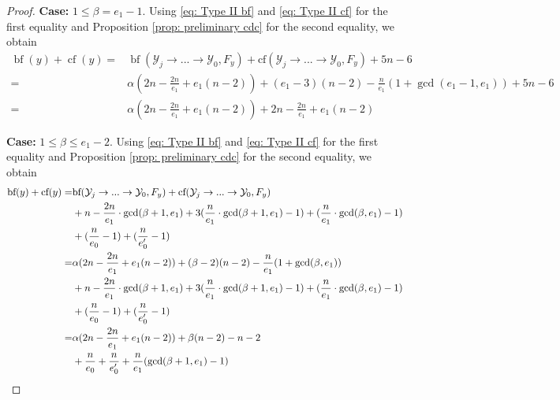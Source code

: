\documentclass[12pt]{amsart}
\numberwithin{equation}{section}
\theoremstyle{definition}
\newcommand{\Y}{\mathcal{Y}}
\newcommand{\tx}[1]{\text{#1}}
\DeclareMathOperator{\blf}{bf}
\DeclareMathOperator{\cf}{cf}
\begin{document}
\begin{proof}
    \textbf{Case:} $1\leq \beta=e_1-1$. Using \eqref{eq: Type II bf} and \eqref{eq: Type II cf} for the first equality and Proposition \ref{prop: preliminary cdc} for the second equality, we obtain
    \begin{align*}
        \blf(y)+\cf(y)=&\blf(\Y_j\to...\to\Y_0,F_y)+\tx{cf}(\Y_j\to...\to\Y_0,F_y)+5n-6\\
        =&\alpha(2n-\frac{2n}{e_1}+e_1(n-2))+(e_1-3)(n-2)-\frac{n}{e_1}(1+\gcd(e_1-1,e_1))+5n-6\\
        =&\alpha(2n-\frac{2n}{e_1}+e_1(n-2))+2n-\frac{2n}{e_1}+e_1(n-2)
    \end{align*}
    
    \textbf{Case:} $1\leq\beta\leq e_1-2$.  Using \eqref{eq: Type II bf} and \eqref{eq: Type II cf} for the first equality and Proposition \ref{prop: preliminary cdc} for the second equality, we obtain
    \begin{align*}
        \tx{bf}(y)+\tx{cf}(y)=&\tx{bf}(\Y_j\to...\to\Y_0,F_y)+\tx{cf}(\Y_j\to...\to\Y_0,F_y)\\
        &+n-\frac{2n}{e_1}\cdot\gcd(\beta+1,e_1)+3(\frac{n}{e_1}\cdot\gcd(\beta+1,e_1)-1)+(\frac{n}{e_1}\cdot \gcd(\beta,e_1)-1)\\
        &+(\frac{n}{e_0}-1)+(\frac{n}{e_0'}-1)\\
        =&\alpha(2n-\frac{2n}{e_1}+e_1(n-2))+(\beta-2)(n-2)-\frac{n}{e_1}(1+\gcd(\beta,e_1))\\
        &+n-\frac{2n}{e_1}\cdot\gcd(\beta+1,e_1)+3(\frac{n}{e_1}\cdot\gcd(\beta+1,e_1)-1)+(\frac{n}{e_1}\cdot \gcd(\beta,e_1)-1)\\
        &+(\frac{n}{e_0}-1)+(\frac{n}{e_0'}-1)\\
        =&\alpha(2n-\frac{2n}{e_1}+e_1(n-2))+\beta(n-2)-n-2\\
        &+\frac{n}{e_0}+\frac{n}{e_0'}+\frac{n}{e_1}(\gcd(\beta+1,e_1)-1)\qedhere
    \end{align*}
\end{proof}
\end{document}
